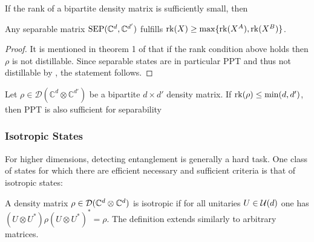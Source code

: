 If the rank of a bipartite density matrix is sufficiently small, then
\begin{prop}\label{prop:rank-condition}Any separable matrix $\text{SEP}(\mathbb{C}^d,\mathbb{C}^{d'})$ fulfills $\mathrm{rk}(X)\geq \max\{\mathrm{rk}(X^A),\mathrm{rk}(X^B)\}$.{}
\end{prop}
\begin{proof}
    It is mentioned in theorem 1 of \cite{Horodecki2003} that if the rank condition above holds then $\rho$ is not distillable. Since separable states are in particular PPT and thus not distillable by \cite{Horodecki1998}, the statement follows.
\end{proof}
\begin{prop}\label{prop:low-rank}
Let $\rho \in \mathcal{D}(\mathbb{C}^d \otimes \mathbb{C}^{d'})$ be a bipartite $d\times d'$ density matrix. If $\mathrm{rk}(\rho) \leq \min(d,d')$, then PPT is also sufficient for separability
\end{prop}










\subsubsection{Isotropic States}
For higher dimensions, detecting entanglement is generally a hard task. One class of states for which there are efficient necessary and sufficient criteria is that of isotropic states:
\begin{definition}
    A density matrix $\rho \in \mathcal D(\mathbb{C}^d \otimes \mathbb{C}^d)$ is isotropic if for all unitaries $U\in \mathcal U(d)$ one has $(U\otimes U^*)\rho(U\otimes U^*)^* = \rho$. The definition extends similarly to arbitrary matrices.
\end{definition}

